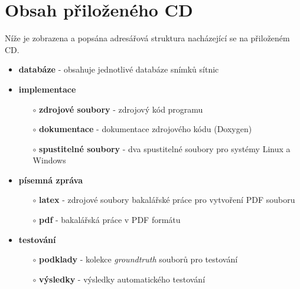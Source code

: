 \chapter{Obsah přiloženého CD}
\label{cd_content}

Níže je zobrazena a popsána adresářová struktura nacházející se na přiloženém CD.

\begin{itemize}
  \item\textbf{databáze} - obsahuje jednotlivé databáze snímků sítnic

  \item\textbf{implementace}
    \begin{itemize}
      \item[$\circ$] \textbf{zdrojové soubory} - zdrojový kód programu
      \item[$\circ$] \textbf{dokumentace} - dokumentace zdrojového kódu (Doxygen)
      \item[$\circ$] \textbf{spustitelné soubory} - dva spustitelné soubory pro systémy Linux a Windows
    \end{itemize}

  \item\textbf{písemná zpráva}
    \begin{itemize}
      \item[$\circ$] \textbf{latex} - zdrojové soubory bakalářské práce pro vytvoření PDF souboru
      \item[$\circ$] \textbf{pdf} - bakalářská práce v PDF formátu
    \end{itemize}

  \item\textbf{testování}
    \begin{itemize}
      \item[$\circ$] \textbf{podklady} - kolekce \emph{groundtruth} souborů pro testování 
      \item[$\circ$] \textbf{výsledky} - výsledky automatického testování
    \end{itemize}  
\end{itemize}